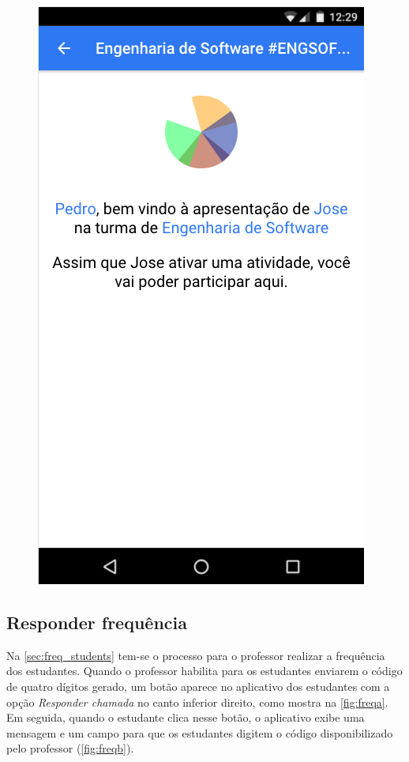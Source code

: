 \begin{figure}[ht]
{    \includegraphics[scale=.4]{imagens/telas/app_ask_success}
    \label{fig:app_ask_b}
  }

  \doautor
  \label{fig:app_ask_id}
\end{figure}

\subsection{Responder frequência}

Na \autoref{sec:freq_students} tem-se o processo para o professor realizar
a frequência dos estudantes. Quando o professor habilita para os
estudantes enviarem o código de quatro dígitos gerado, um botão aparece
no aplicativo dos estudantes com a opção \textit{Responder chamada} no canto inferior
direito, como mostra na \autoref{fig:freqa}. Em seguida, quando o estudante
clica nesse botão, o aplicativo exibe uma mensagem e um campo para que os
estudantes digitem o código disponibilizado pelo professor (\autoref{fig:freqb}).

